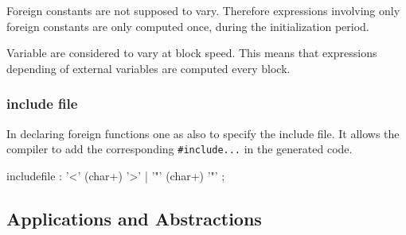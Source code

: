\documentclass[a4paper,10pt]{book}
\begin{document}
Foreign constants are not supposed to vary. Therefore expressions involving only foreign constants are only computed once, during the initialization period. 

Variable are considered to vary at block speed. This means that expressions depending of external variables are computed every block.


\subsubsection{include file}
In declaring foreign functions one as also to specify the include file. It allows the \faust compiler to add the corresponding \lstinline'#include...' in the generated code.


\begin{rail}
includefile : '<' (char+) '>' | '"' (char+) '"' ;
\end{rail}



%  









\subsection{Applications and Abstractions}
\end{document}
